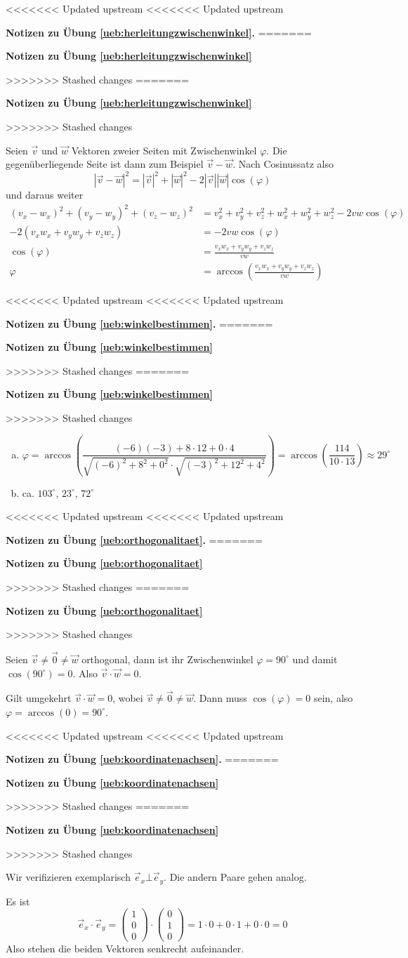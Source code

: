 \documentclass[%
11pt,%
twoside,%
titlepage,%
<<<<<<< Updated upstream
<<<<<<< Updated upstream
german,%
=======
swissgerman,%
>>>>>>> Stashed changes
=======
swissgerman,%
>>>>>>> Stashed changes
headsepline%
]{scrartcl}
\newcommand{\faReturnGray}{\textcolor{gray}{\faMailReply}} %
\newcommand{\faReturnGray}{\textcolor{gray}{\faMailReply}} %
\theoremstyle{definition}
\theoremstyle{plain}
\newcommand{\concatueb}[1]{ueb:#1}%
\newcommand{\concatlsg}[1]{lsg:#1}%
\newenvironment{lsg}[1]{%
<<<<<<< Updated upstream
<<<<<<< Updated upstream
    \par\noindent\textbf{Notizen zu Übung \ref{\concatueb{#1}}.}%
    \label{\concatlsg{#1}}
=======
    \par\noindent\textbf{Notizen zu Übung \ref{\concatueb{#1}}}\label{\concatlsg{#1}}
    \hfill\hyperref[\concatueb{#1}]{\faReturnGray}\par %
>>>>>>> Stashed changes
=======
    \par\noindent\textbf{Notizen zu Übung \ref{\concatueb{#1}}}\label{\concatlsg{#1}}
    \hfill\hyperref[\concatueb{#1}]{\faReturnGray}\par %
>>>>>>> Stashed changes
}{%
    \par%
}
\begin{document}
\begin{lsg}{herleitungzwischenwinkel}
Seien $\vec{v}$ und $\vec{w}$ Vektoren zweier Seiten mit Zwischenwinkel $\varphi$. Die gegenüberliegende Seite ist dann zum Beispiel $\vec{v}-\vec{w}$. Nach Cosinussatz also
$$|\vec{v}-\vec{w}|^2=|\vec{v}|^2+|\vec{w}|^2-2|\vec{v}||\vec{w}|\cos(\varphi)$$
und daraus weiter
\begin{align*}
    (v_x-w_x)^2+(v_y-w_y)^2+(v_z-w_z)^2 &= v_x^2+v_y^2+v_z^2+w_x^2+w_y^2+w_z^2-2vw\cos(\varphi)\\
    -2(v_xw_x+v_yw_y+v_zw_z) &= -2vw\cos(\varphi)\\
    \cos(\varphi) &= \frac{v_xw_x+v_yw_y+v_zw_z}{vw}\\
    \varphi &= \arccos\left(\frac{v_xw_x+v_yw_y+v_zw_z}{vw}\right)
\end{align*}
\end{lsg}
\begin{lsg}{winkelbestimmen}
\begin{enumerate}[a)]
    \item $$\varphi=\arccos\left(\frac{(-6)(-3)+8\cdot12+0\cdot4}{\sqrt{(-6)^2+8^2+0^2}\cdot\sqrt{(-3)^2+12^2+4^2}}\right)=\arccos\left(\frac{114}{10\cdot13}\right)\approx29^\circ$$
    \item ca. $103^\circ$, $23^\circ$, $72^\circ$
\end{enumerate}
\end{lsg}
\begin{lsg}{orthogonalitaet}
    Seien $\vec{v}\neq\vec{0}\neq\vec{w}$ orthogonal, dann ist ihr Zwischenwinkel $\varphi=90^\circ$ und damit $\cos(90^\circ)=0$. Also $\vec{v}\cdot\vec{w}=0$.

    Gilt umgekehrt $\vec{v}\cdot\vec{w}=0$, wobei $\vec{v}\neq\vec{0}\neq\vec{w}$. Dann muss $\cos(\varphi)=0$ sein, also $\varphi=\arccos(0)=90^\circ$.
\end{lsg}
\begin{lsg}{koordinatenachsen}
Wir verifizieren exemplarisch $\vec{e}_x\bot\vec{e}_y$. Die andern Paare gehen analog.

Es ist
$$\vec{e}_x\cdot\vec{e}_y=\begin{pmatrix}
    1\\0\\0
\end{pmatrix}\cdot\begin{pmatrix}
    0\\1\\0
\end{pmatrix}=1\cdot0+0\cdot1+0\cdot0=0$$
Also stehen die beiden Vektoren senkrecht aufeinander.
\end{lsg}
\end{document}
